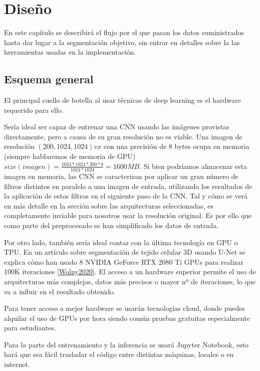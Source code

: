 \chapter{Diseño}\label{requisitos}

En este capítulo se describirá el flujo por el que pasan los datos suministrados hasta dar lugar a la segmentación objetivo, sin entrar en detalles sobre la las herramientas usadas en la implementación.

\section{Esquema general}\label{sec:diseno-general}

El principal cuello de botella al usar técnicas de deep learning es el hardware requerido para ello. 

Sería ideal ser capaz de entrenar una CNN usando las imágenes provistas directamente, pero a causa de su gran resolución no es viable. Una imagen de resolución $ (200, 1024, 1024)vx $ con una precisión de 8 bytes ocupa en memoria (siempre hablaremos de memoria de GPU) $size(imagen)=\frac{1024*1024*200*8}{1024*1024}=1600MB $. Si bien podríamos almacenar esta imagen en memoria, las CNN se caracterizan por aplicar un gran número de filtros distintos en paralelo a una imagen de entrada, utilizando los resultados de la aplicación de estos filtros en el siguiente paso de la CNN. Tal y cómo se verá en más detalle en la sección sobre las arquitecturas seleccionadas, es completamente inviable para nosotros usar la resolución original. Es por ello que como parte del preprocesado se han simplificado los datos de entrada.

Por otro lado, también sería ideal contar con la última tecnología en GPU o TPU. En un artículo sobre segmentación de tejido celular 3D usando U-Net se explica cómo han usado 8 NVIDIA GeForce RTX 2080 Ti GPUs para realizar 100K iteraciones \ref{Wolny2020}. El acceso a un hardware superior permite el uso de arquitecturas más complejas, datos más precisos o mayor nº de iteraciones, lo que va a influir en el resultado obtenido. 

Para tener acceso a mejor hardware se usarán tecnologías cloud, donde puedes alquilar el uso de GPUs por hora siendo común pruebas gratuitas especialmente para estudiantes.

Para la parte del entrenamiento y la inferencia se usará Jupyter Notebook, esto hará que sea fácil trasladar el código entre distintas máquinas, locales o en internet.

